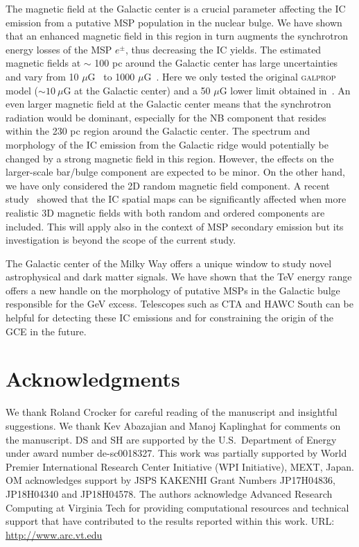 \documentclass[doublespace,nopageskip]{VTthesis}
\begin{document}
The magnetic field at the Galactic center is a crucial parameter affecting the IC emission from a putative MSP population in the nuclear bulge. We have shown that an enhanced magnetic field in this region in turn augments the synchrotron energy losses of the MSP $e^\pm$, thus decreasing the IC yields. The estimated magnetic fields at $\sim$ 100 pc around the Galactic center has large uncertainties and vary from 10 $\mu$G~\cite{2005ApJ...626L..23L} to 1000 $\mu$G~\cite{1989ApJ...343..703M}. Here we only tested the original \textsc{galprop} model ($\sim 10\ \mu$G at the Galactic center) and a 50 $\mu$G lower limit obtained in~\citet{2010Natur.463...65C}. An even larger magnetic field at the Galactic center means that the synchrotron radiation would be dominant, especially for the NB component that resides within the 230 pc region around the Galactic center. The spectrum and morphology of the IC emission from the Galactic ridge would potentially be changed by a strong magnetic field in this region. However, the effects on the larger-scale bar/bulge component are expected to be minor. On the other hand, we have only considered the 2D random magnetic field component. A recent study~\cite{2019PhRvD..99d3007O} showed that the IC spatial maps can be significantly affected when more realistic 3D magnetic fields with both random and ordered components are included. This will apply also in the context of MSP secondary emission but its investigation is beyond the scope of the current study.

The Galactic center of the Milky Way offers a unique window to study novel astrophysical and dark matter signals. We have shown that the TeV energy range offers a new handle on the morphology of putative MSPs in the Galactic bulge responsible for the GeV excess. Telescopes such as CTA and HAWC South can be helpful for detecting these IC emissions and for constraining the origin of the GCE in the future.

\section*{Acknowledgments}
We thank Roland Crocker for careful reading of the manuscript and insightful suggestions. We thank Kev Abazajian and  Manoj Kaplinghat for comments on the manuscript. DS and SH are supported by the U.S.~Department of Energy under award number de-sc0018327. This work was partially supported by World Premier International Research Center Initiative (WPI Initiative), MEXT, Japan. OM acknowledges support by JSPS KAKENHI Grant Numbers JP17H04836, JP18H04340 and JP18H04578. The authors acknowledge Advanced Research Computing at Virginia Tech for providing computational resources and technical support that have contributed to the results reported within this work. URL: \url{http://www.arc.vt.edu}
\end{document}
